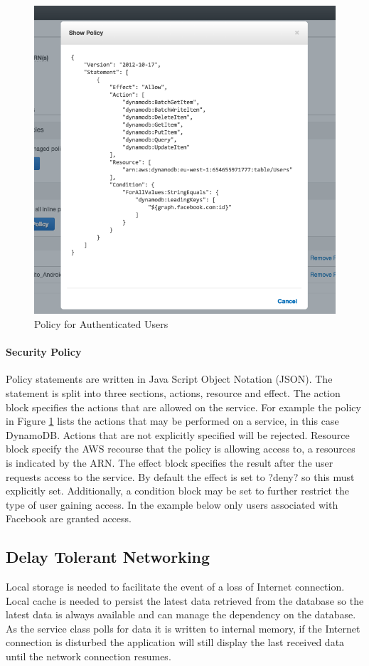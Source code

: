 \documentclass[a4paper, 11pt]{article}
\begin{document}
\begin{figure}[!htbp]
\centering
\includegraphics[width=\textwidth]{iam_policy.png}
\caption{Policy for Authenticated Users}\label{fig:iam}
\end{figure}

\paragraph{Security Policy}Policy statements are written in Java Script Object Notation (JSON). The statement is split into three sections, actions, resource and effect. The action block specifies the actions that are allowed on the service. For example the policy in Figure \ref{fig:iam} lists the actions that may be performed on a service, in this case DynamoDB. Actions that are not explicitly specified will be rejected. Resource block specify the AWS recourse that the policy is allowing access to, a resources is indicated by the ARN. The effect block specifies the result after the user requests access to the service. By default the effect is set to ?deny? so this must explicitly set. Additionally, a condition block may be set to further restrict the type of user gaining access. In the example below only users associated with Facebook are granted access.

\subsection{Delay Tolerant Networking}
\label{sec:Delay Tolerant Networking}
Local storage is needed to facilitate the event of a loss of Internet connection. Local cache is needed to persist the latest data retrieved from the database so the latest data is always available and can manage the dependency on the database. As the service class polls for data it is written to internal memory, if the Internet connection is disturbed the application will still display the last received data until the network connection resumes. 
\end{document}

